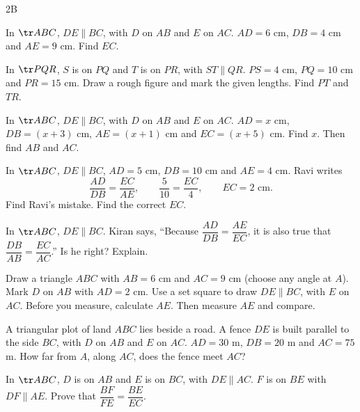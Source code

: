 \begin{exercise}{2B}
  \item In $\tr ABC$, $DE\parallel BC$, with $D$ on $AB$ and $E$ on $AC$. $AD=6$ cm, $DB=4$ cm and $AE=9$ cm. Find $EC$.
  \item In $\tr PQR$, $S$ is on $PQ$ and $T$ is on $PR$, with $ST\parallel QR$. $PS=4$ cm, $PQ=10$ cm and $PR=15$ cm. Draw a rough figure and mark the given lengths. Find $PT$ and $TR$.
  \item In $\tr ABC$, $DE\parallel BC$, with $D$ on $AB$ and $E$ on $AC$. $AD=x$ cm, $DB=(x+3)$ cm, $AE=(x+1)$ cm and $EC=(x+5)$ cm. Find $x$. Then find $AB$ and $AC$.
  \item In $\tr ABC$, $DE\parallel BC$, $AD=5$ cm, $DB=10$ cm and $AE=4$ cm. Ravi writes
  \[
  \dfrac{AD}{DB}=\dfrac{EC}{AE},\qquad \dfrac{5}{10}=\dfrac{EC}{4},\qquad EC=2\text{ cm}.
  \]
  Find Ravi's mistake. Find the correct $EC$.
  \item In $\tr ABC$, $DE\parallel BC$. Kiran says, ``Because $\dfrac{AD}{DB}=\dfrac{AE}{EC}$, it is also true that $\dfrac{DB}{AB}=\dfrac{EC}{AC}$.'' Is he right? Explain.
  \item Draw a triangle $ABC$ with $AB=6$ cm and $AC=9$ cm (choose any angle at $A$). Mark $D$ on $AB$ with $AD=2$ cm. Use a set square to draw $DE\parallel BC$, with $E$ on $AC$. Before you measure, calculate $AE$. Then measure $AE$ and compare.
  \item A triangular plot of land $ABC$ lies beside a road. A fence $DE$ is built parallel to the side $BC$, with $D$ on $AB$ and $E$ on $AC$. $AD=30$ m, $DB=20$ m and $AC=75$ m. How far from $A$, along $AC$, does the fence meet $AC$?
  \item In $\tr ABC$, $D$ is on $AB$ and $E$ is on $BC$, with $DE\parallel AC$. $F$ is on $BE$ with $DF\parallel AE$. Prove that $\dfrac{BF}{FE}=\dfrac{BE}{EC}$.
  \begin{center}\end{center}
\end{exercise}

